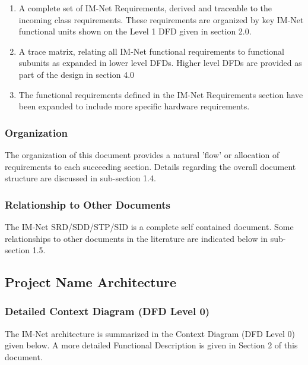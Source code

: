 \documentclass[letterpaper,12pt]{article}
\begin{document}
{\begin{enumerate}
\item  A complete set of IM-Net Requirements, derived and traceable to the incoming class requirements.  These requirements are organized by key IM-Net functional units shown on the Level 1 DFD given in section 2.0.

\item  A trace matrix, relating all IM-Net functional requirements to functional subunits as expanded in lower level DFDs. Higher level DFDs are provided as part of the design in section 4.0

\item  The functional requirements defined in the IM-Net Requirements section have been expanded to include more specific hardware requirements.
\end{enumerate}

\textcolor{subsubsection}{\subsubsection{Organization}}

The organization of this document provides a natural 'flow' or allocation of requirements to each succeeding section. Details regarding the overall document structure are discussed in sub-section 1.4.

\textcolor{subsubsection}{\subsubsection{Relationship to Other Documents}}

The IM-Net SRD/SDD/STP/SID is a complete self contained document. Some relationships to other documents in the literature are indicated below in sub-section 1.5.

\textcolor{subsection}{\subsection{Project Name Architecture}}
 
\textcolor{subsubsection}{\subsubsection{Detailed Context Diagram (DFD Level 0)}}

The IM-Net architecture is summarized in the Context Diagram (DFD Level 0) given below. A more detailed Functional Description is given in Section 2 of this document.\\

}
\end{document}
